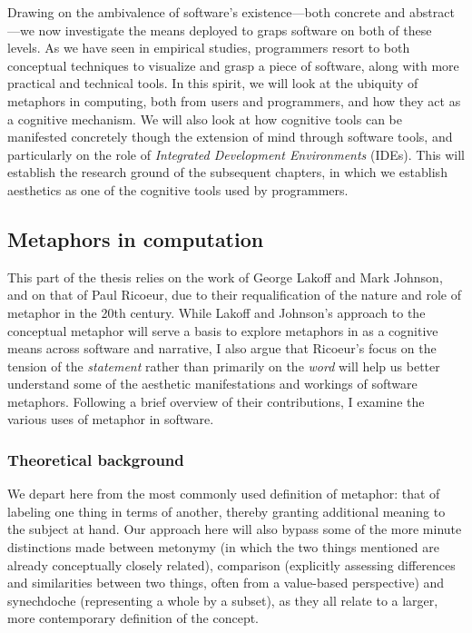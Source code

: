 Drawing on the ambivalence of software's existence—both concrete and abstract—we now investigate the means deployed to graps software on both of these levels. As we have seen in empirical studies, programmers resort to both conceptual techniques to visualize and grasp a piece of software, along with more practical and technical tools. In this spirit, we will look at the ubiquity of metaphors in computing,  both from users and programmers, and how they act as a cognitive mechanism. We will also look at how cognitive tools can be manifested concretely though the extension of mind through software tools, and particularly on the role of \emph{Integrated Development Environments} (IDEs). This will establish the research ground of the subsequent chapters, in which we establish aesthetics as one of the cognitive tools used by programmers.

\subsection{Metaphors in computation}
\label{subsec:metaphor-computation}

This part of the thesis relies on the work of George Lakoff and Mark Johnson, and on that of Paul Ricoeur, due to their requalification of the nature and role of metaphor in the 20th century. While Lakoff and Johnson's approach to the conceptual metaphor will serve a basis to explore metaphors in as a cognitive means across software and narrative, I also argue that Ricoeur's focus on the tension of the \emph{statement} rather than primarily on the \emph{word} will help us better understand some of the aesthetic manifestations and workings of software metaphors. Following a brief overview of their contributions, I examine the various uses of metaphor in software.

\subsubsection{Theoretical background}
\label{subsubsec:metaphors-background}


We depart here from the most commonly used definition of metaphor: that of labeling one thing in terms of another, thereby granting additional meaning to the subject at hand. Our approach here will also bypass some of the more minute distinctions made between metonymy (in which the two things mentioned are already conceptually closely related), comparison (explicitly assessing differences and similarities between two things, often from a value-based perspective) and synechdoche (representing a whole by a subset), as they all relate to a larger, more contemporary definition of the concept.

